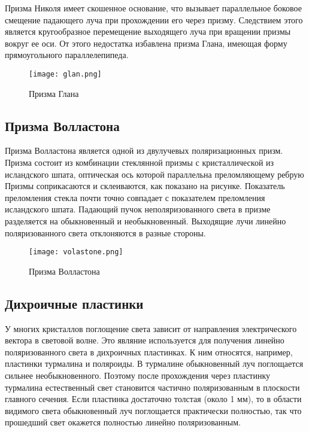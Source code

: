 Призма Николя имеет скошенное основание, что вызывает параллельное боковое смещение падающего луча при прохождении его через призму. Следствием этого является кругообразное перемещение выходящего луча при вращении призмы вокруг ее оси. От этого недостатка избавлена призма Глана, имеющая форму прямоугольного параллелепипеда.

\begin{figure}[h!]
    \centering
    \texttt{[image: glan.png]}
    \caption{Призма Глана}
    \label{fig:my_label}
\end{figure} 

\newpage

\subsection{Призма Волластона}

Призма Волластона является одной из двулучевых поляризационных призм.  Призма состоит из комбинации стеклянной призмы с кристаллической из исландского шпата, оптическая ось которой параллельна преломляющему ребрую Призмы соприкасаются и склеиваются, как показано на рисунке. Показатель преломления стекла почти точно совпадает с показателем преломления исландского шпата. Падающий пучок неполяризованного света в призме разделяется на обыкновенный и необыкновенный. Выходящие лучи линейно поляризованного света отклоняются в разные стороны.

\begin{figure}[h!]
    \centering
    \texttt{[image: volastone.png]}
    \caption{Призма Волластона}
    \label{fig:my_label}
\end{figure} 

\subsection{Дихроичные пластинки}

У многих кристаллов поглощение света зависит от направления электрического вектора в световой волне. Это являние используется для получения линейно поляризованного света в дихроичных пластинках. К ним относятся, например, пластинки турмалина и поляроиды. В турмалине обыкновенный луч поглощается сильнее необыкновенного. Поэтому после прохождения через пластинку турмалина естественный свет становится частично поляризованным в плоскости главного сечения. Если пластинка достаточно толстая (около 1 мм), то в области видимого света обыкновенный луч поглощается практически полностью, так что прошедший свет окажется полностью линейно поляризованным. 


